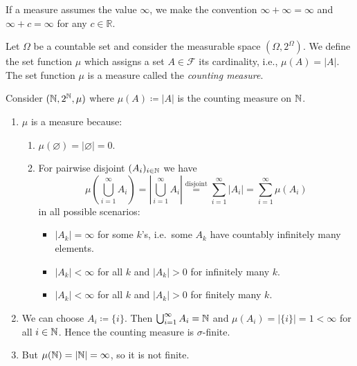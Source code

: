\begin{remark}
  If a measure assumes the value $\infty$, we make the convention $\infty + \infty = \infty$ and $\infty + c = \infty$ for any $c \in \mathbb{R}$.
\end{remark}

\begin{definition}\label{def:counting-measure} %
Let $\Omega$ be a countable set and consider the measurable space $(\Omega,2^\Omega)$.
We define the set function $\mu$ which assigns a set $A \in \mathcal{F}$ its cardinality, i.e., $\mu(A) = |A|$.
The set function $\mu$ is a measure called the \emph{counting measure}.
\end{definition}
\begin{example}\label{ex:counting-measure-on-N}
Consider $(\mathbb{N},2^{\mathbb{N}},\mu)$ where $\mu(A) \coloneq |A|$ is the counting measure on $\mathbb{N}$.
\begin{enumerate}[label=(\alph*)]
\item 
$\mu$ is a measure because:
  \begin{enumerate}[label=(\roman*)]
  \item 
  $\mu(\varnothing) = |\varnothing| = 0$. \cmark

  \item 
  For pairwise disjoint $(A_i)_{i\in\mathbb{N}}$ we have
  \[
  \mu\left(\bigcup_{i=1}^{\infty} A_i\right)
  =
  \left|\bigcup_{i=1}^{\infty} A_i\right|
  \overset{\text{disjoint}}{=}
  \sum_{i=1}^{\infty}|A_i|
  =
  \sum_{i=1}^{\infty}\mu(A_i)
  \]
  in all possible scenarios:
  \begin{itemize}[before={\parskip = 0em}, nosep]
  \item $|A_k| = \infty$ for some $k$'s, i.e.\ some $A_k$ have countably infinitely many elements. \cmark
  \item $|A_k| < \infty$ for all $k$ and $|A_k| > 0$ for infinitely many $k$. \cmark
  \item $|A_k| < \infty$ for all $k$ and $|A_k| > 0$ for finitely many $k$. \cmark
  \end{itemize}
  \end{enumerate}

\item 
We can choose $A_i \coloneq \{i\}$. 
Then $\bigcup_{i=1}^{\infty} A_i = \mathbb{N}$ and $\mu(A_i) = |\{i\}| = 1 < \infty$ for all $i \in \mathbb{N}$.
Hence the counting measure is $\sigma$-finite.

\item 
But $\mu(\mathbb{N}) = |\mathbb{N}| = \infty$, so it is not finite.
\qedhere
\end{enumerate}
\end{example}



